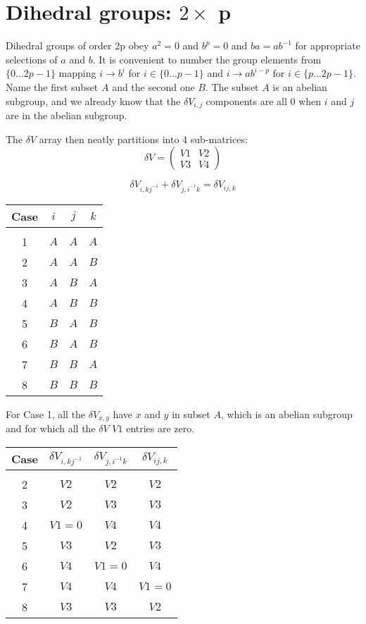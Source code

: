 \documentclass{revtex4-1}
\begin{document}
\section{Dihedral groups:  $2 \times$ p}
Dihedral groups of order 2p obey $a^2=0$ and $b^p=0$
and $ba=ab^{-1}$ for appropriate selections of $a$ and $b$.  It is convenient
to number the group elements from $\{0\dots 2p-1\}$ mapping $i \rightarrow b^i$ for 
$i \in \{0\dots p-1\}$ and $i \rightarrow ab^{i-p}$ for $i \in \{p\dots 2p-1\}$.
Name the first subset $A$ and the second one $B$.   The subset $A$ is an abelian subgroup,
and we already know that the $\delta V_{i,j}$ components are all $0$ when $i$ and $j$ are
in the abelian subgroup.

\par The $\delta V$ array then neatly partitions into 4 sub-matrices:
\begin{equation}
\delta V = \left(\begin{array}{cc} V1 & V2 \\ V3 & V4
\end{array}\right)
\end{equation}

$$\delta V_{i,kj^{-1}} + \delta V_{j,i^{-1}k} = \delta V_{ij,k}$$

\begin{tabular}{c|ccc}
Case & $i$ & $j$ & $k$ \\ \hline \\
1 & $A$ & $A$ & $A$ \\
2 & $A$ & $A$ & $B$ \\
3 & $A$ & $B$ & $A$ \\
4 & $A$ & $B$ & $B$ \\
5 & $B$ & $A$ & $B$ \\
6 & $B$ & $A$ & $B$ \\
7 & $B$ & $B$ & $A$ \\
8 & $B$ & $B$ & $B$ 
\end{tabular}

\par
For Case 1, all the $\delta V_{x,y}$ have $x$ and $y$ in subset $A$, which is
an abelian subgroup and for which all the $\delta V$ $V1$ entries are
zero.  

\begin{tabular}{c|ccc}
Case & $\delta V_{i,kj^{-1}}$ & $\delta V_{j,i^{-1}k}$ & $\delta V_{ij,k}$ \\ \hline \\
2 & $V2$ & $V2$ & $V2$ \\
3 & $V2$ & $V3$ & $V3$ \\
4 & $V1=0$ & $V4$ & $V4$ \\
5 & $V3$ & $V2$ & $V3$ \\ 
6 & $V4$ & $V1=0$ & $V4$ \\ 
7 & $V4$ & $V4$ & $V1=0$ \\ 
8 & $V3$ & $V3$ & $V2$ 
\end{tabular}
\end{document}
